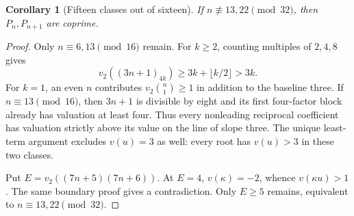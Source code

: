 \documentclass[11pt]{article}
\newtheorem{corollary}{Corollary}
\begin{document}
\begin{corollary}[Fifteen classes out of sixteen]
\label{cor:fifteen-sixteenths}
If $n\not\equiv13,22\pmod{32}$, then $P_n,P_{n+1}$ are coprime.
\end{corollary}
\begin{proof}
Only $n\equiv6,13\pmod{16}$ remain.
For $k\ge2$, counting multiples of $2,4,8$ gives
\[
 v_2((3n+1)_{4k})\ge3k+\lfloor k/2\rfloor>3k.
\]
For $k=1$, an even $n$ contributes $v_2\binom n1\ge1$ in
addition to the baseline three. If $n\equiv13\pmod{16}$,
then $3n+1$ is divisible by eight and its first four-factor
block already has valuation at least four.
Thus every nonleading reciprocal coefficient has valuation
strictly above its value on the line of slope three.
The unique least-term argument excludes $v(u)=3$ as well:
every root has $v(u)>3$ in these two classes.

Put $E=v_2((7n+5)(7n+6))$.
At $E=4$, $v(\kappa)=-2$, whence $v(\kappa u)>1$.
The same boundary proof gives a contradiction.
Only $E\ge5$ remains, equivalent to $n\equiv13,22\pmod{32}$.
\end{proof}
\end{document}
